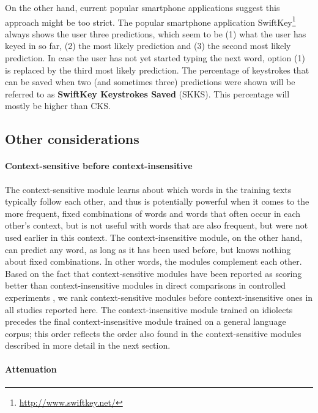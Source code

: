 \documentclass[12pt]{article}
\begin{document}
On the other hand, current popular smartphone applications suggest this approach might be too strict. The popular smartphone application SwiftKey\footnote{\url{http://www.swiftkey.net/}} always shows the user three predictions, which seem to be (1) what the user has keyed in so far, (2) the most likely prediction and (3) the second most likely prediction. In case the user has not yet started typing the next word, option (1) is replaced by the third most likely prediction. The percentage of keystrokes that can be saved when two (and sometimes three) predictions were shown will be referred to as \textbf{SwiftKey Keystrokes Saved} (SKKS). This percentage will mostly be higher than CKS.

\subsection{Other considerations}

\paragraph{Context-sensitive before context-insensitive}

The context-sensitive module learns about which words in the training texts typically follow each other, and thus is potentially powerful when it comes to the more frequent, fixed combinations of words and words that often occur in each other's context, but is not useful with words that are also frequent, but were not used earlier in this context. The context-insensitive module, on the other hand, can predict any word, as long as it has been used before, but knows nothing about fixed combinations. In other words, the modules complement each other. Based on the fact that context-sensitive modules have been reported as scoring better than context-insensitive modules in direct comparisons in controlled experiments \cite{Lesher+99}, we rank context-sensitive modules before context-insensitive ones in all studies reported here. The context-insensitive module trained on idiolects precedes the final context-insensitive module trained on a general language corpus; this order reflects the order also found in the context-sensitive modules described in more detail in the next section.

\paragraph{Attenuation}
\end{document}
